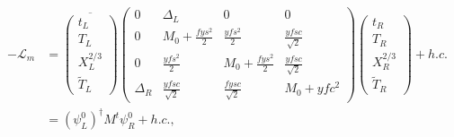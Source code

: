 \documentclass[a4paper]{article}
\begin{document}
\begin{align}
 -\mathcal{L}_{m} &= 
\overline{\begin{pmatrix}
t_{L} \\ T_{L} \\ X^{2/3}_{L} \\ \tilde{T}_{L}
\end{pmatrix}}
\begin{pmatrix}
0 & \Delta_{L} & 0 & 0 \\
0 & M_{0} + \frac{fys^{2}}{2} & \frac{yfs^{2}}{2} & \frac{yfsc}{\sqrt{2}} \\
0 & \frac{yfs^{2}}{2} & M_{0} + \frac{fys^{2}}{2} & \frac{yfsc}{\sqrt{2}} \\
\Delta_{R} & \frac{yfsc}{\sqrt{2}} & \frac{fysc}{\sqrt{2}} & M_{0} + yfc^{2}
\end{pmatrix}
\begin{pmatrix}
t_{R} \\ T_{R} \\ X^{2/3}_{R} \\ \tilde{T}_{R}
\end{pmatrix} + h.c. \\
&= \left(\psi_{L}^{0}\right)^\dag M^{t} \psi_{R}^{0} + h.c.,
\end{align}
\end{document}
